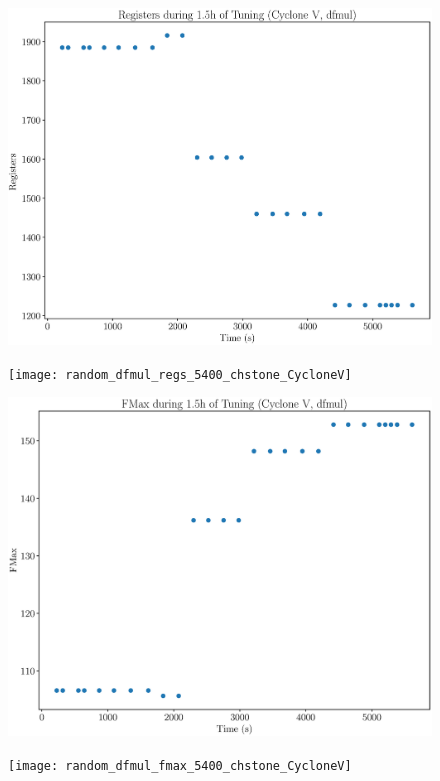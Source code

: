 \documentclass[12pt, a4paper]{article}
\begin{document}
\begin{figure}[htpb]
    \begin{minipage}{.48\textwidth}
        \includegraphics[scale=.25]{dfmul_regs_5400_chstone_CycloneV}
    \end{minipage}%
    \hfill
    \begin{minipage}{.48\textwidth}
        \texttt{[image: random\_dfmul\_regs\_5400\_chstone\_CycloneV]}
    \end{minipage}%

    \begin{minipage}{.48\textwidth}
        \includegraphics[scale=.25]{dfmul_fmax_5400_chstone_CycloneV}
    \end{minipage}%
    \hfill
    \begin{minipage}{.48\textwidth}
        \texttt{[image: random\_dfmul\_fmax\_5400\_chstone\_CycloneV]}
    \end{minipage}%
\end{figure}
\end{document}

